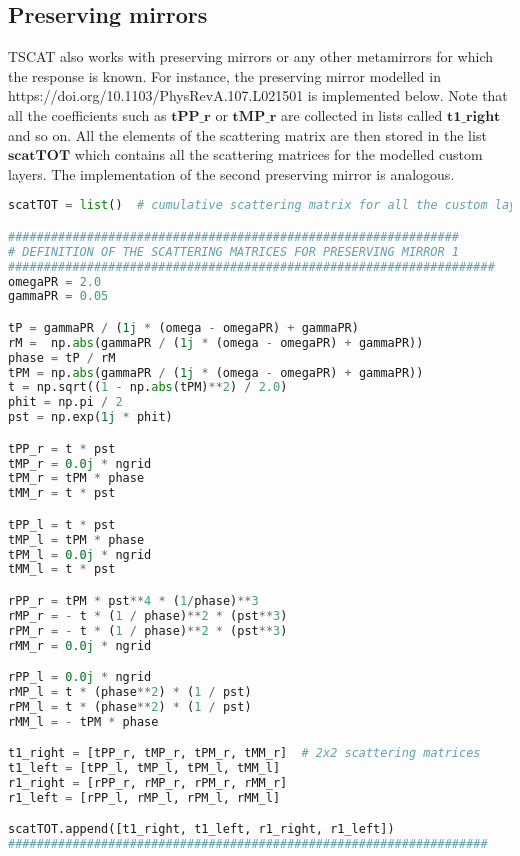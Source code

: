 \documentclass[aps,prl,10pt,onecolumn,superscriptaddress]{revtex4-2}
\begin{document}
\subsection{Preserving mirrors}
TSCAT also works with preserving mirrors or any other metamirrors for which the response is known. For instance, the preserving mirror modelled in https://doi.org/10.1103/PhysRevA.107.L021501 is implemented below. Note that all the coefficients such as $\mathbf{tPP\_r}$ or $\mathbf{tMP\_r}$ are collected in lists called $\mathbf{t1\_right}$ and so on. All the elements of the scattering matrix are then stored in the list $\mathbf{scatTOT}$ which contains all the scattering matrices for the modelled custom layers. The implementation of the second preserving mirror is analogous.
\begin{lstlisting}[language=Python, caption=Implementation of the response of the first preserving mirror.]
scatTOT = list()  # cumulative scattering matrix for all the custom layers

###############################################################
# DEFINITION OF THE SCATTERING MATRICES FOR PRESERVING MIRROR 1 
####################################################################
omegaPR = 2.0
gammaPR = 0.05

tP = gammaPR / (1j * (omega - omegaPR) + gammaPR)
rM =  np.abs(gammaPR / (1j * (omega - omegaPR) + gammaPR))
phase = tP / rM
tPM = np.abs(gammaPR / (1j * (omega - omegaPR) + gammaPR))
t = np.sqrt((1 - np.abs(tPM)**2) / 2.0)
phit = np.pi / 2
pst = np.exp(1j * phit)

tPP_r = t * pst 
tMP_r = 0.0j * ngrid
tPM_r = tPM * phase 
tMM_r = t * pst

tPP_l = t * pst 
tMP_l = tPM * phase 
tPM_l = 0.0j * ngrid
tMM_l = t * pst 

rPP_r = tPM * pst**4 * (1/phase)**3 
rMP_r = - t * (1 / phase)**2 * (pst**3) 
rPM_r = - t * (1 / phase)**2 * (pst**3) 
rMM_r = 0.0j * ngrid

rPP_l = 0.0j * ngrid
rMP_l = t * (phase**2) * (1 / pst)
rPM_l = t * (phase**2) * (1 / pst)
rMM_l = - tPM * phase

t1_right = [tPP_r, tMP_r, tPM_r, tMM_r]  # 2x2 scattering matrices
t1_left = [tPP_l, tMP_l, tPM_l, tMM_l]
r1_right = [rPP_r, rMP_r, rPM_r, rMM_r]
r1_left = [rPP_l, rMP_l, rPM_l, rMM_l]

scatTOT.append([t1_right, t1_left, r1_right, r1_left])
###################################################################
\end{lstlisting}
\end{document}
